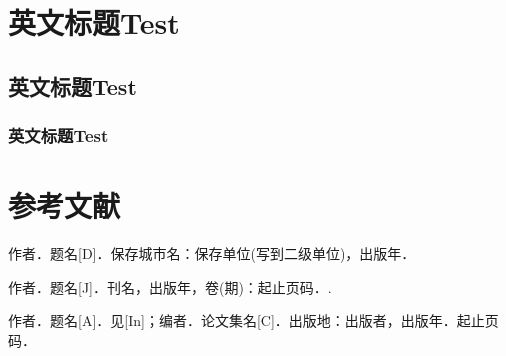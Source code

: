 \documentclass{nwputhesis}
\begin{document}
\section{英文标题Test}
\subsection{英文标题Test}
\subsubsection{英文标题Test}
\makespace
\section*{参考文献}
\begingroup  %
\renewcommand{\section}[2]{}
\begin{thebibliography}{99}     %
    \addtolength{\itemsep}{-0.6em} %
    \begin{spacing}{1.0}           %

        作者．题名[D]．保存城市名：保存单位(写到二级单位)，出版年．

        作者．题名[J]．刊名，出版年，卷(期)：起止页码．.

        作者．题名[A]．见[In]；编者．论文集名[C]．出版地：出版者，出版年．起止页码．

    \end{spacing}
\end{thebibliography}
\end{document}
